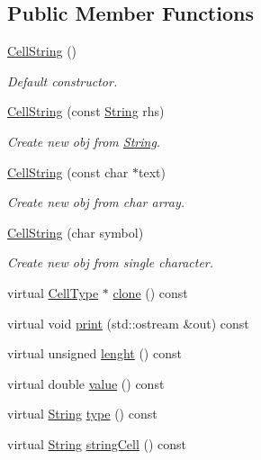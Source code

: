 \subsection*{Public Member Functions}
\begin{DoxyCompactItemize}
\item 
\mbox{\label{class_cell_string_a6a7bf500e09988f0de08ceeb9699fff9}} 
\hyperlink{class_cell_string_a6a7bf500e09988f0de08ceeb9699fff9}{Cell\+String} ()
\begin{DoxyCompactList}\small\item\em Default constructor. \end{DoxyCompactList}\item 
\mbox{\label{class_cell_string_a6b310a8a51cca0a121ec497d4f954606}} 
\hyperlink{class_cell_string_a6b310a8a51cca0a121ec497d4f954606}{Cell\+String} (const \hyperlink{class_string}{String} rhs)
\begin{DoxyCompactList}\small\item\em Create new obj from \hyperlink{class_string}{String}. \end{DoxyCompactList}\item 
\mbox{\label{class_cell_string_afbddebf6bfc5d2deb316a60141485724}} 
\hyperlink{class_cell_string_afbddebf6bfc5d2deb316a60141485724}{Cell\+String} (const char $\ast$text)
\begin{DoxyCompactList}\small\item\em Create new obj from char array. \end{DoxyCompactList}\item 
\mbox{\label{class_cell_string_a7381bd83019a62b33aac3d887da61b64}} 
\hyperlink{class_cell_string_a7381bd83019a62b33aac3d887da61b64}{Cell\+String} (char symbol)
\begin{DoxyCompactList}\small\item\em Create new obj from single character. \end{DoxyCompactList}\item 
virtual \hyperlink{class_cell_type}{Cell\+Type} $\ast$ \hyperlink{class_cell_string_a293639128fa52df8f72f88335e23d2f0}{clone} () const
\item 
virtual void \hyperlink{class_cell_string_a13f416bd887f2cbceb93273316d16d65}{print} (std\+::ostream \&out) const
\item 
virtual unsigned \hyperlink{class_cell_string_a6a8f5570104283eb4bb8e9ed4b998fb7}{lenght} () const
\item 
virtual double \hyperlink{class_cell_string_a452054b2d80356d66ed7504d7b1b8d69}{value} () const
\item 
virtual \hyperlink{class_string}{String} \hyperlink{class_cell_string_a0670fd5a35f8e05c985379acd5e4b88f}{type} () const
\item 
virtual \hyperlink{class_string}{String} \hyperlink{class_cell_string_ac601c93ecb70391eae65236c56c561a5}{string\+Cell} () const
\end{DoxyCompactItemize}


